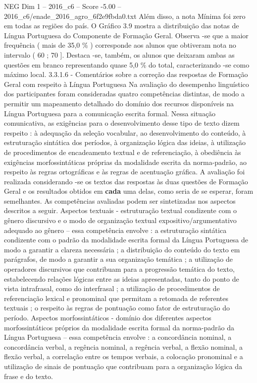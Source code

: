 \begin{textsample}{NEG Dim 1 – 2016\_c6 – Score -5.00 – 2016\_c6/enade\_2016\_agro\_6f2e9fbda0.txt}
Além disso, a nota Mínima foi zero em todas as regiões do país.
O Gráfico 3.9 mostra a distribuição das notas de Língua Portuguesa do Componente de Formação Geral.
Observa -se que a maior frequência ( mais de 35,0 \% ) corresponde aos alunos que obtiveram nota no intervalo ( 60 ; 70 ].
Destaca -se, também, os alunos que deixaram ambas as questões em branco representando quase 5,0 \% do total, caracterizando -se como máximo local. 3.3.1.6 - Comentários sobre a correção das respostas de Formação Geral com respeito à Língua Portuguesa Na avaliação do desempenho linguístico dos participantes foram consideradas quatro competências distintas, de modo a permitir um mapeamento detalhado do domínio dos recursos disponíveis na Língua Portuguesa para a comunicação escrita formal.
Nessa situação comunicativa, as exigências para o desenvolvimento desse tipo de texto dizem respeito : à adequação da seleção vocabular, ao desenvolvimento do conteúdo, à estruturação sintática dos períodos, à organização lógica das ideias, à utilização de procedimentos de encadeamento textual e de referenciação, à obediência às exigências morfossintáticas próprias da modalidade escrita da norma-padrão, ao respeito às regras ortográficas e às regras de acentuação gráfica.
A avaliação foi realizada considerando -se os textos das respostas às duas questões de Formação Geral e os resultados obtidos em \textbf{cada} uma delas, como seria de se esperar, foram semelhantes.
As competências avaliadas podem ser sintetizadas nos aspectos descritos a seguir.
Aspectos textuais - estruturação textual condizente com o gênero discursivo e o modo de organização textual expositivo/argumentativo adequado ao gênero – essa competência envolve : a estruturação sintática condizente com o padrão da modalidade escrita formal da Língua Portuguesa de modo a garantir a clareza necessária ; a distribuição do conteúdo do texto em parágrafos, de modo a garantir a sua organização temática ; a utilização de operadores discursivos que contribuam para a progressão temática do texto, estabelecendo relações lógicas entre as ideias apresentadas, tanto do ponto de vista intrafrasal, como do interfrasal ; a utilização de procedimentos de referenciação lexical e pronominal que permitam a retomada de referentes textuais ; o respeito às regras de pontuação como fator de estruturação do período.
Aspectos morfossintáticos - domínio dos diferentes aspectos morfossintáticos próprios da modalidade escrita formal da norma-padrão da Língua Portuguesa – essa competência envolve : a concordância nominal, a concordância verbal, a regência nominal, a regência verbal, a flexão nominal, a flexão verbal, a correlação entre os tempos verbais, a colocação pronominal e a utilização de sinais de pontuação que contribuam para a organização lógica da frase e do texto.

\end{textsample}
